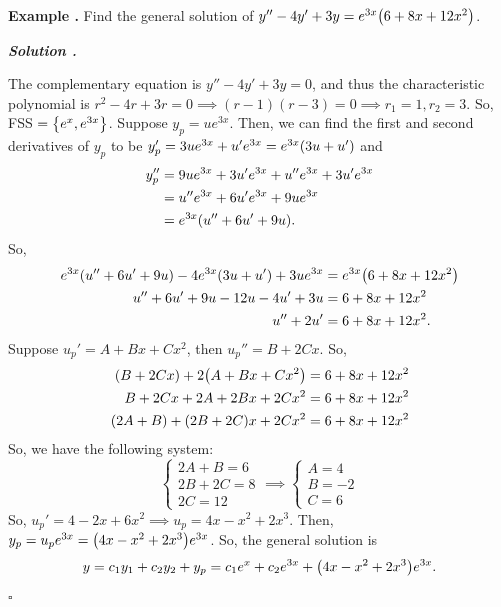 \documentclass[12pt, a4paper]{article}
\newcounter{index}[subsection]
\newenvironment*{eg}{\begin{framed}\par\noindent\textbf{Example \thesubsection.\stepcounter{index}\theindex}}{\par\end{framed}}
\newcounter{nprf}[subsection]
\newenvironment*{sol}{\par\indent\textbf{\textit{Solution \stepcounter{nprf}\thenprf.}}\par}{\hfill{$\square$}\par}
\def\C{{\mathbb{C}}}
\begin{document}
\begin{eg}
	Find the general solution of $y''-4y'+3y=e^{3x}\qty(6+8x+12x^2)$.
	\begin{sol}
		The complementary equation is $y''-4y'+3y=0$, and thus the characteristic polynomial is $r^2-4r+3r=0\implies(r-1)(r-3)=0\implies r_1=1,r_2=3$. So, FSS $=\qty{e^x,e^{3x}}$. Suppose $y_p=ue^{3x}$. Then, we can find the first and second derivatives of $y_p$ to be  $y_p'=3ue^{3x}+u'e^{3x}=e^{3x}\qty(3u+u')$ and \begin{align*}y_p''&=9ue^{3x}+3u'e^{3x}+u''e^{3x}+3u'e^{3x}\\&=u''e^{3x}+6u'e^{3x}+9ue^{3x}\\&=e^{3x}\qty(u''+6u'+9u).\end{align*} So, \begin{align*}e^{3x}\qty(u''+6u'+9u)-4e^{3x}\qty(3u+u')+3ue^{3x}&=e^{3x}\qty(6+8x+12x^2)\\u''+6u'+9u-12u-4u'+3u&=6+8x+12x^2\\u''+2u'&=6+8x+12x^2.\end{align*} Suppose $u_p'=A+Bx+Cx^2$, then $u_p''=B+2Cx$. So, \begin{align*}(B+2Cx)+2\qty(A+Bx+Cx^2)&=6+8x+12x^2\\B+2Cx+2A+2Bx+2Cx^2&=6+8x+12x^2\\(2A+B)+(2B+2C)x+2Cx^2&=6+8x+12x^2\end{align*} So, we have the following system: \[\begin{cases}2A+B=6\\2B+2C=8\\2C=12\end{cases}\implies\begin{cases}A=4\\B=-2\\C=6\end{cases}\] So, $u_p'=4-2x+6x^2\implies u_p=4x-x^2+2x^3$. Then, $y_p=u_pe^{3x}=\qty(4x-x^2+2x^3)e^{3x}$. So, the general solution is \[y=c_1y_1+c_2y_2+y_p=c_1e^{x}+c_2e^{3x}+\qty(4x-x^2+2x^3)e^{3x}.\]
	\end{sol}
\end{eg}
\end{document}
